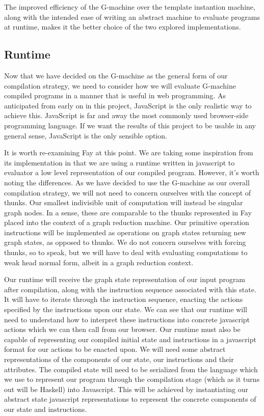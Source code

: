 \documentclass[11pt]{article}
\begin{document}
The improved efficiency of the G-machine over the template
instantion machine, along with the intended ease of writing
an abstract machine to evaluate programs at runtime, makes
it the better choice of the two explored implementations.


\subsection{Runtime}
Now that we have decided on the G-machine as the general
form of our compilation strategy, we need to consider how
we will evaluate G-machine compiled programs in a manner
that is useful in web programming. As anticipated from
early on in this project, JavaScript is the only realistic
way to achieve this. JavaScript is far and away the most
commonly used browser-side programming language. If we
want the results of this project to be usable in any
general sense, JavaScript is the only sensible option.

It is worth re-examining Fay at this point. We are
taking some inspiration from its implementation in
that we are using a runtime written in javascript to 
evaluator a low level representation of our compiled
program. However, it's worth noting the differences.
As we have decided to use the G-machine as our overall
compilation strategy, we 
will not need to concern ourselves with the
concept of thunks. Our smallest indivisible unit of
computation will instead be singular graph nodes. 
In a sense, these are comparable to the thunks
represented in Fay placed into the context of a graph
reduction machine. Our primitive operation instructions
will be implemented as operations on graph states
returning new graph states, as opposed to thunks. We
do not concern ourselves with forcing thunks, so to
speak, but we will have to deal with evaluating 
computations to weak head normal form, albeit in a 
graph reduction context.

Our runtime will receive the graph state representation
of our input program after compilation, along with the
instruction sequence associated with this state. It will
have to iterate through the instruction sequence, enacting
the actions specified by the instructions upon our state.
We can see that our runtime will need to understand how
to interpret these instructions into concrete javascript
actions which we can then call from our browser. Our 
runtime must also be capable of representing our compiled
initial state and instructions in a javascript format 
for our actions to be enacted upon. We will 
need some abstract representations of the components of
our state, our instructions and their attributes. The
compiled state will need to be serialized from the 
language which we use to represent our program through
the compilation stage (which as it turns out will be
Haskell) into Javascript. This will be achieved by
instantiating our abstract state javascript
representations to represent the concrete components of
our state and instructions.
\end{document}
